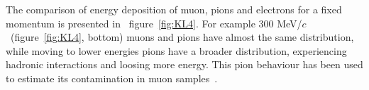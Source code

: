 The comparison of energy deposition of muon, pions and electrons for a fixed momentum is presented in ~figure~\ref{fig:KL4}. 
For example 300 MeV/$c$~(figure~\ref{fig:KL4}, bottom) muons and pions have almost the same distribution, while moving to lower energies pions have a broader distribution, experiencing hadronic interactions and loosing more energy.
This pion behaviour has been used to estimate its contamination in muon samples~\cite{2016JInst..11P3001A}. 


